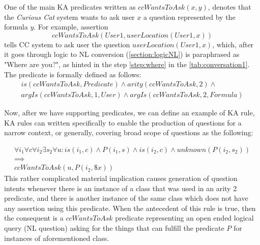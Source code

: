 \begin{definition}\label{def:pred_ccWantsToAsk}
One of the main KA predicates written as $ccWantsToAsk(x,y)$, denotes that the 
\emph{Curious Cat} system wants to ask user $x$ a question represented by the
formula $y$. For example, assertion 
\begin{equation*}
ccWantsToAsk(User1, userLocation(User1,x))
\end{equation*}
tells CC system to ask user the question $userLocation(User1,x)$, which,
after it goes through logic to NL conversion (\autoref{section:logicNL}) is 
paraphrased as
"Where are you?", as hinted in the step \ref{step:where} in the 
\autoref{tab:conversation1}. The predicate is formally defined as follows:
\begin{equation}\label{as:ccWantsToAsk}
\begin{gathered}
	is(ccWantsToAsk,Predicate) \land arity(ccWantsToAsk,2) \land\\ 
	argIs(ccWantsToAsk,1,User) \land argIs(ccWantsToAsk,2,Formula)
\end{gathered}
\end{equation}
\end{definition}

Now, after we have supporting predicates, we can define an example of KA rule, 
KA rules can written specifically to enable the production of questions for a 
narrow context, or generally, covering broad scope of questions as the
following:

\begin{equation}\label{as:generalRule}
\begin{gathered}
\forall i_1 \forall c \forall i_2 \exists s_2 \forall u:is(i_1,c) \land P(i_1,s) \land is(i_2,c)\land unknown(P(i_2,s_2)) \\ 
	\implies \\
ccWantsToAsk(u,P(i_2,\$x))
\end{gathered}
\end{equation}
This rather complicated material implication causes generation of question 
intents whenever there is an instance of a class that was used in an arity 2 
predicate, and there is another instance of the same class which does not have 
any assertion using this predicate. When the antecedent of this rule is true,
then the consequent is a $ccWantsToAsk$ predicate representing an open
ended logical query (NL question) asking for the things that can fulfill the
predicate $P$ for instances of aforementioned class.

